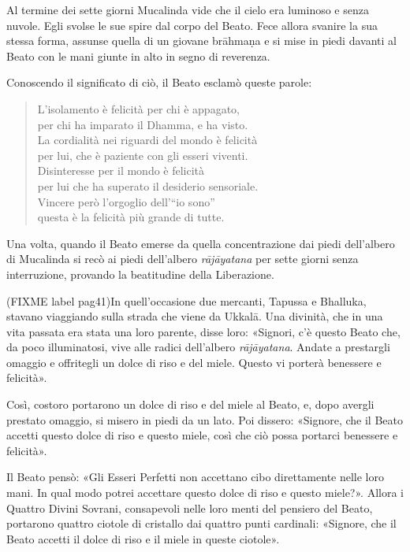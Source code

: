 Al termine dei sette giorni Mucalinda vide che il cielo era luminoso e
senza nuvole. Egli svolse le sue spire dal corpo del Beato. Fece allora
svanire la sua stessa forma, assunse quella di un giovane brāhmaṇa e si
mise in piedi davanti al Beato con le mani giunte in alto in segno di
reverenza.


Conoscendo il significato di ciò, il Beato esclamò queste parole:


\begin{quote}
L’isolamento è felicità per chi è appagato, \\
per chi ha imparato il Dhamma, e ha visto. \\
La cordialità nei riguardi del mondo è felicità \\
per lui, che è paziente con gli esseri viventi. \\
Disinteresse per il mondo è felicità \\
per lui che ha superato il desiderio sensoriale. \\
Vincere però l’orgoglio dell’“io sono” \\
questa è la felicità più grande di tutte.
\end{quote}



Una volta, quando il Beato emerse da quella concentrazione dai piedi
dell’albero di Mucalinda si recò ai piedi dell’albero \emph{rājāyatana} per
sette giorni senza interruzione, provando la beatitudine della
Liberazione.


(FIXME label pag41)In quell’occasione due mercanti, Tapussa e Bhalluka, stavano viaggiando
sulla strada che viene da Ukkalā. Una divinità, che in una vita passata
era stata una loro parente, disse loro: «Signori, c’è questo Beato che,
da poco illuminatosi, vive alle radici dell’albero \emph{rājāyatana}. Andate
a prestargli omaggio e offritegli un dolce di riso e del miele. Questo
vi porterà benessere e felicità».


Così, costoro portarono un dolce di riso e del miele al Beato, e, dopo
avergli prestato omaggio, si misero in piedi da un lato. Poi dissero:
«Signore, che il Beato accetti questo dolce di riso e questo miele, così
che ciò possa portarci benessere e felicità».


Il Beato pensò: «Gli Esseri Perfetti non accettano cibo direttamente
nelle loro mani. In qual modo potrei accettare questo dolce di riso e
questo miele?». Allora i Quattro Divini Sovrani, consapevoli nelle loro
menti del pensiero del Beato, portarono quattro ciotole di cristallo dai
quattro punti cardinali: «Signore, che il Beato accetti il dolce di riso
e il miele in queste ciotole».


